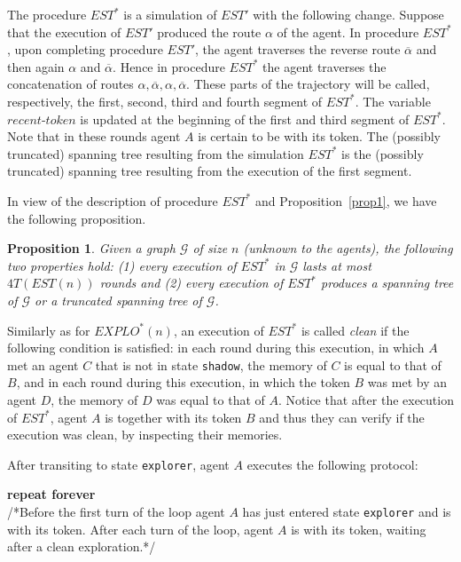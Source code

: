 \documentclass[11pt]{article}
\newtheorem{proposition}{Proposition}[section]
\begin{document}
{The procedure $EST^*$ is a simulation of $EST'$ with the following change.}
 Suppose that the execution of {$EST'$} produced the route $\alpha$ of the agent. In procedure $EST^*$, upon completing
 procedure $EST'$, the agent traverses the reverse route $\overline{ \alpha}$ and then again $\alpha$ and $\overline{ \alpha}$. Hence in procedure $EST^*$
 the agent traverses the concatenation of routes $\alpha,\overline{ \alpha}, \alpha,\overline{ \alpha}$. These parts of the trajectory will be called, respectively, the
 first, second, third and fourth segment of $EST^*$.
 The variable $recent$-$token$ is updated at the beginning of the first and third segment of $EST^*$. Note that in these rounds agent $A$ is certain to be with its token. {The (possibly truncated) spanning tree resulting from the simulation $EST^*$ is the (possibly truncated) spanning tree resulting from the execution of the first segment.}

{In view of the description of procedure $EST^*$ and Proposition~\ref{prop1}, we have the following proposition.}

{
\begin{proposition}
\label{prop2}
Given a graph $\mathcal{G}$ of size $n$ (unknown to the agents), the following two properties hold: (1) every execution of $EST^*$ in $\mathcal{G}$ lasts at most $4T(EST(n))$ rounds and (2) every execution of $EST^*$ produces a spanning tree of $\mathcal{G}$ or a truncated spanning tree of $\mathcal{G}$.
\end{proposition}}
   


Similarly as for $EXPLO^*(n)$,  an execution of $EST^*$  is called {\em clean} if 
the following condition is satisfied: in each round  during this execution, in which $A$ met an agent $C$ {that is not in state {\tt shadow}}, the memory of $C$ is equal to that of $B$,
and in each round during this execution, in which the token $B$ was met by an agent $D$, the memory of $D$ was equal to that of $A$. Notice that 
after the execution of  $EST^*$, agent $A$ is together with its token $B$ and thus they can verify if the execution was clean, by inspecting their memories.


 After transiting to state {\tt explorer}, agent $A$ executes the following protocol:
 
\noindent
 {\bf repeat forever}\\ 
 /*Before the first turn of the loop agent $A$ has just entered state {\tt explorer} and is with its token.
 After each turn of the loop, agent $A$ is with its token, waiting  after a clean exploration.*/ 
 
\end{document}
